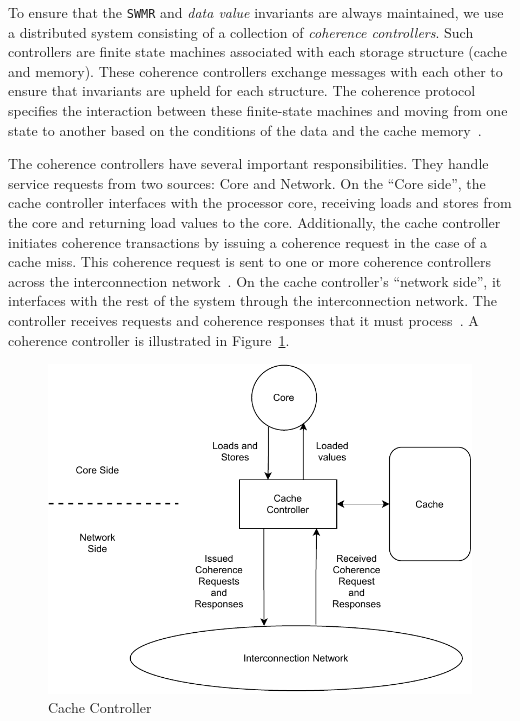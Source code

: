 To ensure that the \texttt{SWMR} and \emph{data value} invariants are always maintained, we use a distributed system consisting of a collection of \emph{coherence controllers}. Such controllers are finite state machines associated with each storage structure (cache and memory). These coherence controllers exchange messages with each other to ensure that invariants are upheld for each structure. The coherence protocol specifies the interaction between these finite-state machines and moving from one state to another based on the conditions of the data and the cache memory~\cite{DBLP_series_synthesis_2020Nagarajan}.

The coherence controllers have several important responsibilities. They handle service requests from two sources: Core and Network. On the ``Core side'', the cache controller interfaces with the processor core, receiving loads and stores from the core and returning load values to the core. Additionally, the cache controller initiates coherence transactions by issuing a coherence request in the case of a cache miss. This coherence request is sent to one or more coherence controllers across the interconnection network~\cite{DBLP_series_synthesis_2020Nagarajan}. On the cache controller's ``network side'', it interfaces with the rest of the system through the interconnection network. The controller receives requests and coherence responses that it must process~\cite{DBLP_series_synthesis_2020Nagarajan}. A coherence controller is illustrated in Figure~\ref{fig:cache_controller}.

\begin{figure}[ht]
  \centering
  \includegraphics[scale=0.9]{contents/figures/III_3_Cache_Controller.pdf}
  \caption{\label{fig:cache_controller}Cache Controller}
\end{figure}


